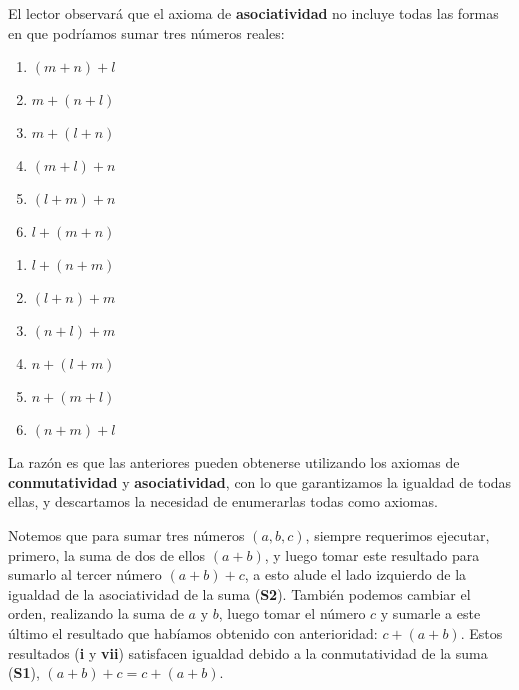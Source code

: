 \documentclass[11pt]{article}
\begin{document}
El lector observará que el axioma de \textbf{asociatividad} no incluye todas las formas en que podríamos sumar tres números reales:

\begin{adjustbox}{minipage=0.5\linewidth,margin=0pt \smallskipamount,center}
    \noindent\begin{minipage}[c]{.5\linewidth}
    \begin{enumerate}[label=\roman*.]
        \item $(m+n)+l$
        \item $m+(n+l)$
        \item $m+(l+n)$
        \item $(m+l)+n$
        \item $(l+m)+n$
        \item $l+(m+n)$
    \end{enumerate}
    \end{minipage}%
\begin{minipage}[c]{.5\linewidth}
    \begin{enumerate}[start=7,label=\roman*.]
        \item $l+(n+m)$
        \item $(l+n)+m$
        \item $(n+l)+m$
        \item $n+(l+m)$
        \item $n+(m+l)$
        \item $(n+m)+l$
    \end{enumerate}
\end{minipage}
\end{adjustbox}

La razón es que las anteriores pueden obtenerse utilizando los axiomas de \textbf{conmutatividad} y \textbf{asociatividad}, con lo que garantizamos la igualdad de todas ellas, y descartamos la necesidad de enumerarlas todas como axiomas.

Notemos que para sumar tres números $(a,b,c)$, siempre requerimos ejecutar, primero, la suma de dos de ellos $(a+b)$, y luego tomar este resultado para sumarlo al tercer número $(a+b)+c$, a esto alude el lado izquierdo de la igualdad de la asociatividad de la suma (\textbf{S2}). También podemos cambiar el orden, realizando la suma de $a$ y $b$, luego tomar el número $c$ y sumarle a este último el resultado que habíamos obtenido con anterioridad: $c+(a+b)$. Estos resultados (\textbf{i} y \textbf{vii}) satisfacen igualdad debido a la conmutatividad de la suma (\textbf{S1}), $(a+b)+c=c+(a+b)$.
\end{document}
